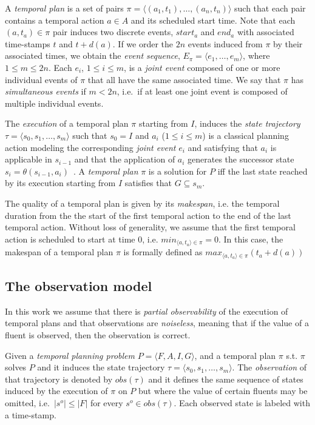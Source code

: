 \documentclass[letterpaper]{article} %
\newcommand{\tup}[1]{{\langle #1 \rangle}}
\begin{document}
A {\em temporal plan} is a set of pairs $\pi=\tup{(a_1,t_1), \ldots, (a_n,t_n)}$ such that each pair contains a temporal action $a\in A$ and its scheduled start time. Note that each $(a,t_a)\in \pi$ pair induces two discrete events, $start_a$ and $end_a$ with associated time-stamps $t$ and $t+d(a)$. If we order the $2n$ events induced from $\pi$ by their associated times, we obtain the {\em event sequence}, $E_{\pi}=\langle e_1,\ldots,e_m\rangle$, where {\small $1\leq m\leq 2n$}. Each $e_i$, {\small $1\leq i\leq m$}, is a {\em joint event} composed of one or more individual events of $\pi$ that all have the same associated time. We say that $\pi$ has {\em simultaneous events} if $m<2n$, i.e.~if at least one joint event is composed of multiple individual events. 

The {\em execution} of a temporal plan $\pi$ starting from $I$, induces the {\em state trajectory} $\tau=\tup{s_0, s_1, \ldots, s_m}$ such that $s_0=I$ and $a_i$ ({\small $1\leq i\leq m$}) is a classical planning action modeling the corresponding {\em joint event} $e_i$ and satisfying that $a_i$ is applicable in $s_{i-1}$ and that the application of $a_i$ generates the successor state $s_i=\theta(s_{i-1},a_i)$~\cite{jimenez2015temporal}. A {\em temporal plan} $\pi$ is a solution for $P$ iff the last state reached by its execution starting from $I$ satisfies that $G\subseteq s_m$.

The quality of a temporal plan is given by its {\em makespan}, i.e. the temporal duration from the the start of the first temporal action to the end of the last temporal action. Without loss of generality, we assume that the first temporal action is scheduled to start at time 0, i.e. $min_{\tup{a,t_a}\in\pi}= 0$. In this case, the makespan of a temporal plan $\pi$ is formally defined as $max_{\tup{a,t_a}\in\pi}(t_a+d(a))$


\subsection{The observation model}
In this work we assume that there is {\em partial observability} of the execution of temporal plans and that observations are {\em noiseless}, meaning that if the value of a fluent is observed, then the observation is correct.

Given a {\em temporal planning problem} $P=\tup{F,A,I,G}$, and a temporal plan $\pi$ s.t. $\pi$ solves $P$ and it induces the state trajectory $\tau=\tup{s_0, s_1, \ldots, s_m}$. The {\em observation} of that trajectory is denoted by $obs(\tau)$ and it defines the same sequence of states induced by the execution of $\pi$ on $P$ but where the value of certain fluents may be omitted, i.e.~$|s^o|\leq |F|$ for every $s^o\in obs(\tau)$. Each observed state is labeled with a time-stamp.
\end{document}
